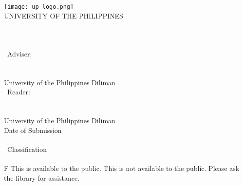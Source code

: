 \center
\vspace*{0.55cm}

\texttt{[image: up\_logo.png]}\\[0.6cm]

UNIVERSITY OF THE PHILIPPINES\\[1cm]

\Degree\\[1.2cm]

\textbf{\Student}\\
\bigskip
\Title\\[1.2cm]

\Type\ Adviser:\\
\bigskip
\textbf{\Adviser}\\
\Department\\
University of the Philippines Diliman\\[1.2cm]

\Type\ Reader:\\
\bigskip
\textbf{\Reader}\\
\Department\\
University of the Philippines Diliman\\[1.2cm]

Date of Submission\\
\medskip
\SubmissionDate\\[1.2cm]

\Type\ Classification\\
\medskip
\textbf{\Classification}\\
\medskip
\if \Classification F
This \MakeLowercase{\Type} is available to the public.
\else
This \MakeLowercase{\Type} is not available to the public. Please ask the library for assistance.
\fi
